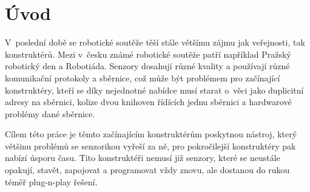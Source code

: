 \chapter*{Úvod}
V~poslední době se robotické soutěže těší stále většímu zájmu jak veřejnosti, tak konstruktérů.
Mezi v~česku známé robotické soutěže patří například Pražský robotický den\cite{Prague_robotic_day} a Robotiáda\cite{Robotiada}.
Senzory dosahují různé kvality a používají různé komunikační protokoly a sběrnice, což může být problémem pro začínající konstruktéry, kteří se díky nejednotné nabídce musí starat o~věci jako duplicitní adresy na sběrnici, kolize dvou knihoven řídících jednu sběrnici a hardwarové problémy dané sběrnice.

Cílem této práce je těmto začínajícím konstruktérům poskytnou nástroj, který většinu problémů se senzorikou vyřeší za ně, pro pokročilejší konstruktéry pak nabízí úsporu času.
Tito konstruktéři nemusí již senzory, které se neustále opakují, stavět, zapojovat a programovat vždy znovu, ale dostanou do rukou téměř plug-n-play řešení.


\newpage